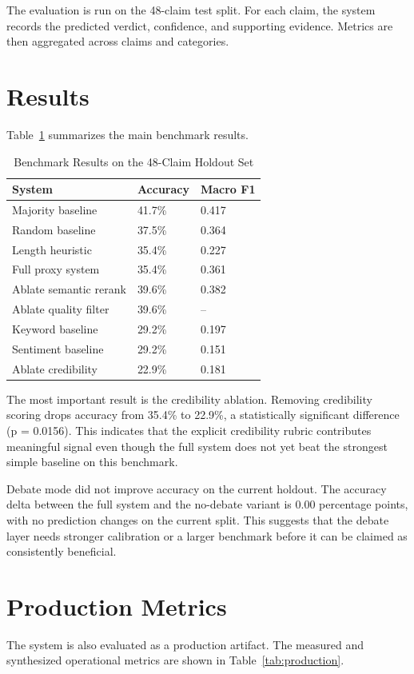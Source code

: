 \documentclass[conference]{IEEEtran}
\begin{document}
The evaluation is run on the 48-claim test split. For each claim, the system records the predicted verdict, confidence, and supporting evidence. Metrics are then aggregated across claims and categories.

\section{Results}
Table~\ref{tab:results} summarizes the main benchmark results.

\begin{table}[t]
\centering
\caption{Benchmark Results on the 48-Claim Holdout Set}
\label{tab:results}
\renewcommand{\arraystretch}{1.1}
\begin{tabular}{p{3.2cm} p{1.3cm} p{1.6cm}}
\toprule
\textbf{System} & \textbf{Accuracy} & \textbf{Macro F1} \\
\midrule
Majority baseline & 41.7\% & 0.417 \\
Random baseline & 37.5\% & 0.364 \\
Length heuristic & 35.4\% & 0.227 \\
Full proxy system & 35.4\% & 0.361 \\
Ablate semantic rerank & 39.6\% & 0.382 \\
Ablate quality filter & 39.6\% & -- \\
Keyword baseline & 29.2\% & 0.197 \\
Sentiment baseline & 29.2\% & 0.151 \\
Ablate credibility & 22.9\% & 0.181 \\
\bottomrule
\end{tabular}
\end{table}

The most important result is the credibility ablation. Removing credibility scoring drops accuracy from 35.4\% to 22.9\%, a statistically significant difference (p = 0.0156). This indicates that the explicit credibility rubric contributes meaningful signal even though the full system does not yet beat the strongest simple baseline on this benchmark.

Debate mode did not improve accuracy on the current holdout. The accuracy delta between the full system and the no-debate variant is 0.00 percentage points, with no prediction changes on the current split. This suggests that the debate layer needs stronger calibration or a larger benchmark before it can be claimed as consistently beneficial.

\section{Production Metrics}
The system is also evaluated as a production artifact. The measured and synthesized operational metrics are shown in Table~\ref{tab:production}.
\end{document}
